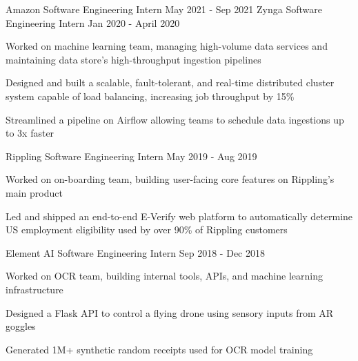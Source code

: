 \documentclass[11pt, a4paper]{awesome-cv}
\begin{document}
\makecvheader





\begin{siderules1}
\begin{cventries}
    \cventry
    {\textit{}}
    {Amazon}
    {Software Engineering Intern}
    {May 2021 - Sep 2021}
    {
    }
    \cventry
    {\textit{}}
    {Zynga}
    {Software Engineering Intern}
    {Jan 2020 - April 2020}
    {
      \begin{cvitems}
        \item {Worked on machine learning team, managing high-volume data services and maintaining data store’s high-throughput ingestion pipelines}
        \item {Designed and built a scalable, fault-tolerant, and real-time distributed cluster system capable of load balancing, increasing job throughput by 15\%}
        \item {Streamlined a pipeline on Airflow allowing teams to schedule data ingestions up to 3x faster}
      \end{cvitems}
    }
    \cventry
    {\textit{}}
    {Rippling}
    {Software Engineering Intern}
    {May 2019 - Aug 2019}
    {
      \begin{cvitems}
        \item {Worked on on-boarding team, building user-facing core features on Rippling’s main product}
        \item {Led and shipped an end-to-end E-Verify web platform to automatically determine US employment eligibility used by over 90\% of Rippling customers}
      \end{cvitems}
    }
    \cventry
    {\textit{}}
    {Element AI}
    {Software Engineering Intern}
    {Sep 2018 - Dec 2018}
    {
      \begin{cvitems}
        \item {Worked on OCR team, building internal tools, APIs, and machine learning infrastructure}
        \item {Designed a Flask API to control a flying drone using sensory inputs from AR goggles}
        \item {Generated 1M+ synthetic random receipts used for OCR model training}

\end{cvitems}}
\end{cventries}
\end{siderules1}
\end{document}
